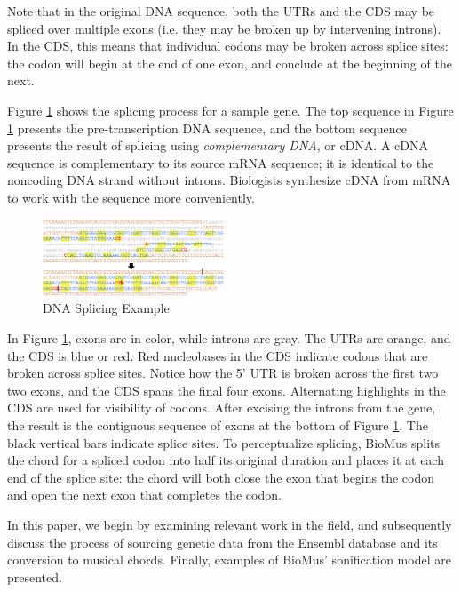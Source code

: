 \documentclass[letterpaper]{article}
\begin{document}
Note that in the original DNA sequence, both the UTRs and the CDS may be spliced over multiple exons (i.e. they may be broken up by intervening introns). In the CDS, this means that individual codons may be broken across splice sites: the codon will begin at the end of one exon, and conclude at the beginning of the next. 

Figure \ref{fig:gene} shows the splicing process for a sample gene. The top sequence in Figure \ref{fig:gene} presents the pre-transcription DNA sequence, and the bottom sequence presents the result of splicing using \textit{complementary DNA}, or cDNA. A cDNA sequence is complementary to its source mRNA sequence;
it is identical to the noncoding DNA strand without introns. Biologists synthesize cDNA from mRNA to work with the sequence more conveniently.

\begin{figure}[h!]
\centering
\includegraphics[width=0.48\textwidth]{images/gene.png}
  \caption{DNA Splicing Example}\label{fig:gene}
  \vspace{-3mm}
\end{figure}



In Figure \ref{fig:gene}, exons are in color, while introns are gray. The UTRs are orange, and the CDS is blue or red. Red nucleobases in the CDS indicate codons that are broken across splice sites. Notice how the 5' UTR is broken across the first two two exons, and the CDS spans the final four exons. Alternating highlights in the CDS are used for visibility of codons.  After excising the introns from the gene, the result is the contiguous sequence of exons at the bottom of Figure \ref{fig:gene}. The black vertical bars indicate splice sites. To perceptualize splicing, BioMus splits the chord for a spliced codon into half its original duration and places it at each end of the splice site: the chord will both close the exon that begins the codon and open the next exon that completes the codon. 

In this paper, we begin by examining relevant work in the field, and subsequently discuss the process of sourcing genetic data from the Ensembl database and its conversion to musical chords. Finally, examples of BioMus' sonification model are presented. 
\end{document}
